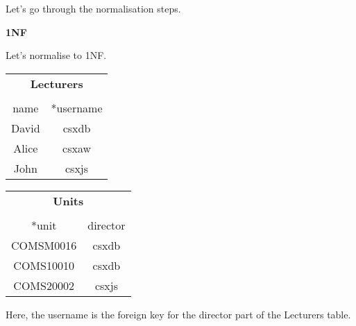 \documentclass[11pt,a4paper,titlepage,dvipsnames,cmyk]{scrartcl}
\begin{document}
Let's go through the normalisation steps.

\begin{center}
    \textbf{1NF} 
\end{center}

Let's normalise to 1NF.

\begin{center}
    \begin{tabular}{c c}
        \multicolumn{2}{c}{\textbf{Lecturers}} \\
        \multicolumn{2}{c}{} \\ \hline
        
        name & *username \\ \hline
        David & csxdb \\
        Alice & csxaw \\
        John & csxjs \\ \hline
    \end{tabular}
    \quad \quad
    \begin{tabular}{c c}
        \multicolumn{2}{c}{\textbf{Units}} \\
        \multicolumn{2}{c}{} \\ \hline
        
        *unit & director \\ \hline
        COMSM0016 & csxdb \\ 
        COMS10010 & csxdb \\
        COMS20002 & csxjs \\ \hline
    \end{tabular}
\end{center}

Here, the username is the foreign key for the director part of the
Lecturers table. 
\end{document}
